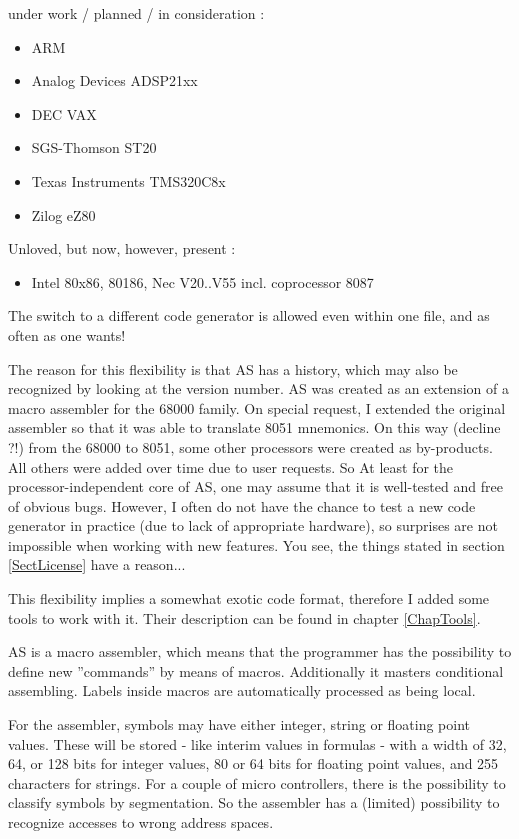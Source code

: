 \documentclass[12pt,twoside]{report}
\newcommand{\asname}{{AS}}
\begin{document}
under work / planned / in consideration :
\begin{itemize}
\item{ARM}
\item{Analog Devices ADSP21xx}
\item{DEC VAX}
\item{SGS-Thomson ST20}
\item{Texas Instruments TMS320C8x}
\item{Zilog eZ80}
\end{itemize}
Unloved, but now, however, present :
\begin{itemize}
\item{Intel 80x86, 80186, Nec V20..V55 incl. coprocessor 8087}
\end{itemize}
The switch to a different code generator is allowed even within one
file, and as often as one wants!

The reason for this flexibility is that \asname{} has a history, which may also
be recognized by looking at the version number. \asname{} was created as an
extension of a macro assembler for the 68000 family. On special request, I
extended the original assembler so that it was able to translate 8051
mnemonics.  On this way (decline ?!) from the 68000 to 8051, some other
processors were created as by-products.  All others were added over time
due to user requests.  So At least for the processor-independent core of
\asname{}, one may assume that it is well-tested and free of obvious bugs.
However, I often do not have the chance to test a new code generator in
practice (due to lack of appropriate hardware), so surprises are not
impossible when working with new features.  You see, the things stated in
section \ref{SectLicense} have a reason...

This flexibility implies a somewhat exotic code format, therefore I
added some tools to work with it. Their description can be found in
chapter \ref{ChapTools}.

\asname{} is a macro assembler, which means that the programmer has the
possibility to define new ''commands'' by means of macros.
Additionally it masters conditional assembling.  Labels inside macros
are automatically processed as being local.

For the assembler, symbols may have either integer, string or floating
point values.  These will be stored - like interim values in formulas -
with a width of 32, 64, or 128 bits for integer values, 80 or 64 bits for floating
point values, and 255 characters for strings.  For a couple of micro
controllers, there is the possibility to classify symbols by segmentation.
So the assembler has a (limited) possibility to recognize accesses to
wrong address spaces.
\end{document}
